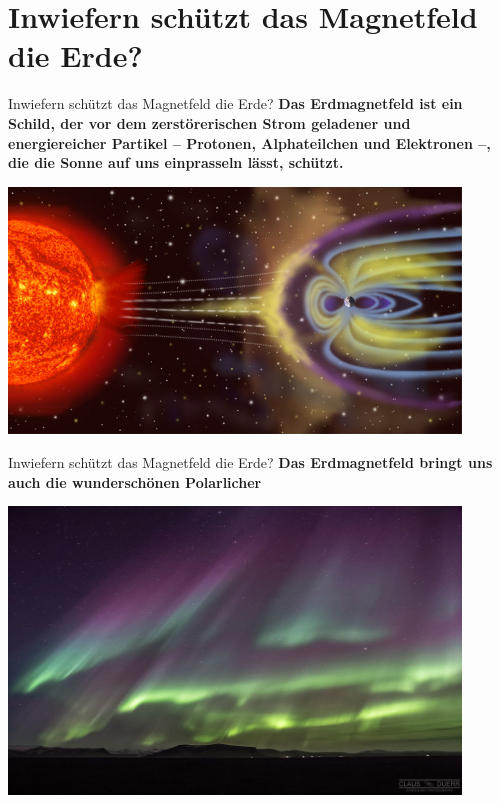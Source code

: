 \documentclass[10pt]{beamer}
\begin{document}
\section{Inwiefern schützt das Magnetfeld die Erde?}
\begin{frame}{Inwiefern schützt das Magnetfeld die Erde?}
\textbf{Das Erdmagnetfeld ist ein Schild, der vor dem zerstörerischen Strom geladener und energiereicher Partikel – Protonen, Alphateilchen und Elektronen –, die die Sonne auf uns einprasseln lässt, schützt.}
%    
\begin{center}
\includegraphics[width=0.9\textwidth]{Sonnenwind.jpg}
\end{center}
\end{frame}

\begin{frame}{Inwiefern schützt das Magnetfeld die Erde?}
\textbf{Das Erdmagnetfeld bringt uns auch die wunderschönen Polarlicher}
\begin{center}
\includegraphics[width=0.9\textwidth]{Bild-6-Starkes-Polarlicht-mit-den-seltenen-blauen-und-lila-Anteilen.jpg}
\end{center}
\end{frame}
\end{document}
